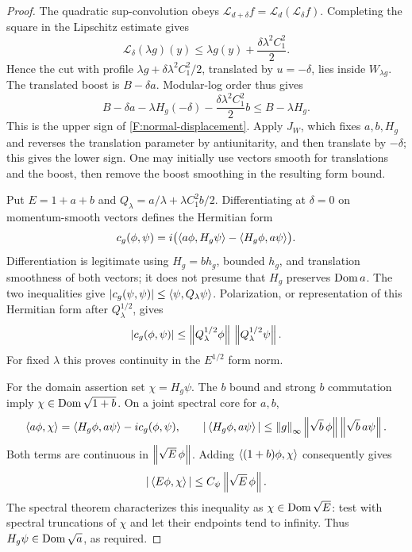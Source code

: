 \begin{proof}
The quadratic sup-convolution obeys
$\mathcal L_{d+\delta}f=\mathcal L_d(\mathcal L_\delta f)$.
Completing the square in the Lipschitz estimate gives
\[
 \mathcal L_\delta(\lambda g)(y)
 \le\lambda g(y)+\frac{\delta\lambda^2 C_1^2}{2}.
\]
Hence the cut with profile
$\lambda g+\delta\lambda^2C_1^2/2$, translated by $u=-\delta$, lies
inside $W_{\lambda g}$. The translated boost is $B-\delta a$.
Modular-log order thus gives
\[
 B-\delta a-\lambda H_g(-\delta)
     -\frac{\delta\lambda^2C_1^2}{2}b
 \le B-\lambda H_g.
\]
This is the upper sign of \eqref{F:normal-displacement}. Apply $J_W$,
which fixes $a,b,H_g$ and reverses the translation parameter by
antiunitarity, and then translate by $-\delta$; this gives the lower
sign. One may initially use vectors smooth for translations and the
boost, then remove the boost smoothing in the resulting form bound.

Put $E=1+a+b$ and
$Q_\lambda=a/\lambda+\lambda C_1^2 b/2$. Differentiating at
$\delta=0$ on momentum-smooth vectors defines the Hermitian form
\[
 c_g(\phi,\psi)=i\bigl(
  \left\langle a\phi,H_g\psi\right\rangle-\left\langle H_g\phi,a\psi\right\rangle\bigr).
\]
Differentiation is legitimate using $H_g=bh_g$, bounded $h_g$, and
translation smoothness of both vectors; it does not presume that
$H_g$ preserves $\operatorname{Dom} a$. The two inequalities give
$|c_g(\psi,\psi)|\le\left\langle\psi,Q_\lambda\psi\right\rangle$. Polarization, or
representation of this Hermitian form after $Q_\lambda^{1/2}$, gives
\begin{equation}\label{F:commutator-form}
 |c_g(\phi,\psi)|\le
 \left\lVert Q_\lambda^{1/2}\phi\right\rVert\,
 \left\lVert Q_\lambda^{1/2}\psi\right\rVert.
\end{equation}
For fixed $\lambda$ this proves continuity in the $E^{1/2}$ form norm.

For the domain assertion set $\chi=H_g\psi$. The $b$ bound and strong
$b$ commutation imply $\chi\in\operatorname{Dom}\sqrt{1+b}$. On a joint spectral
core for $a,b$,
\[
 \left\langle a\phi,\chi\right\rangle
   =\left\langle H_g\phi,a\psi\right\rangle-i c_g(\phi,\psi),\qquad
 |\left\langle H_g\phi,a\psi\right\rangle|
 \le\left\lVert g\right\rVert_\infty\left\lVert\sqrt b\,\phi\right\rVert
                           \left\lVert\sqrt b\,a\psi\right\rVert.
\]
Both terms are continuous in $\left\lVert\sqrt E\,\phi\right\rVert$. Adding
$\left\langle(1+b)\phi,\chi\right\rangle$ consequently gives
\[
 |\left\langle E\phi,\chi\right\rangle|\le C_\psi\left\lVert\sqrt E\,\phi\right\rVert.
\]
The spectral theorem characterizes this inequality as
$\chi\in\operatorname{Dom}\sqrt E$: test with spectral truncations of $\chi$ and
let their endpoints tend to infinity. Thus $H_g\psi\in\operatorname{Dom}\sqrt a$,
as required.
\end{proof}

